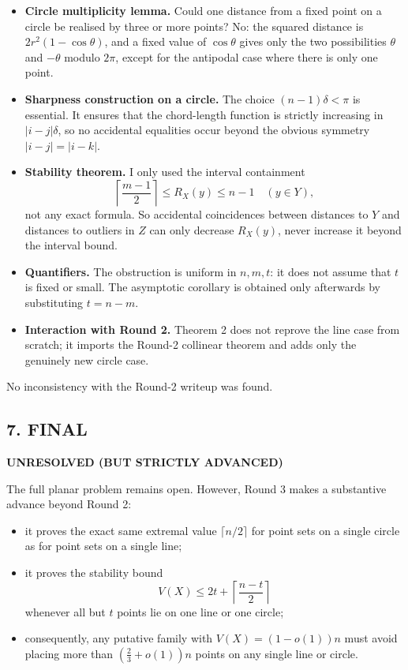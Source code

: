 \begin{itemize}
\item \textbf{Circle multiplicity lemma.}
Could one distance from a fixed point on a circle be realised by three or more points?  No: the squared distance is \(2r^2(1-\cos\theta)\), and a fixed value of \(\cos\theta\) gives only the two possibilities \(\theta\) and \(-\theta\) modulo \(2\pi\), except for the antipodal case where there is only one point.

\item \textbf{Sharpness construction on a circle.}
The choice \((n-1)\delta<\pi\) is essential.  It ensures that the chord-length function is strictly increasing in \(|i-j|\delta\), so no accidental equalities occur beyond the obvious symmetry \(|i-j|=|i-k|\).

\item \textbf{Stability theorem.}
I only used the interval containment
\[
\left\lceil\frac{m-1}{2}\right\rceil\le R_X(y)\le n-1
\quad (y\in Y),
\]
not any exact formula.  So accidental coincidences between distances to \(Y\) and distances to outliers in \(Z\) can only decrease \(R_X(y)\), never increase it beyond the interval bound.

\item \textbf{Quantifiers.}
The obstruction is uniform in \(n,m,t\): it does not assume that \(t\) is fixed or small.  The asymptotic corollary is obtained only afterwards by substituting \(t=n-m\).

\item \textbf{Interaction with Round 2.}
Theorem 2 does not reprove the line case from scratch; it imports the Round-2 collinear theorem and adds only the genuinely new circle case.
\end{itemize}

No inconsistency with the Round-2 writeup was found.

\subsection*{7. FINAL}

\textbf{UNRESOLVED (BUT STRICTLY ADVANCED)}

The full planar problem remains open.  However, Round 3 makes a substantive advance beyond Round 2:

\begin{itemize}
\item it proves the exact same extremal value \(\lceil n/2\rceil\) for point sets on a single circle as for point sets on a single line;
\item it proves the stability bound
\[
V(X)\le 2t+\left\lceil\frac{n-t}{2}\right\rceil
\]
whenever all but \(t\) points lie on one line or one circle;
\item consequently, any putative family with \(V(X)=(1-o(1))n\) must avoid placing more than \((\tfrac23+o(1))n\) points on any single line or circle.
\end{itemize}

